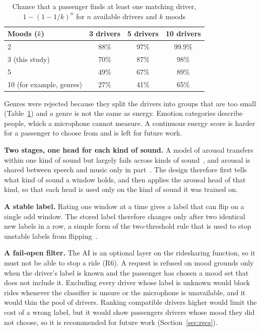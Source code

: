 \begin{table}[htbp]
    \centering
    \caption{Chance that a passenger finds at least one matching driver, $1-(1-1/k)^n$ for $n$ available drivers and $k$ moods}\label{tab:ai-chance}
    \small
    \renewcommand{\arraystretch}{1.2}
    \begin{tabular}{|l|c|c|c|}
        \hline
        \textbf{Moods ($k$)} & \textbf{3 drivers} & \textbf{5 drivers} & \textbf{10 drivers} \\
        \hline
        2 & 88\% & 97\% & 99.9\% \\
        \hline
        3 (this study) & 70\% & 87\% & 98\% \\
        \hline
        5 & 49\% & 67\% & 89\% \\
        \hline
        10 (for example, genres) & 27\% & 41\% & 65\% \\
        \hline
    \end{tabular}
\end{table}

Genres were rejected because they split the drivers into groups that are too small (Table~\ref{tab:ai-chance}) and a genre is not the same as energy. Emotion categories describe people, which a microphone cannot measure. A continuous energy score is harder for a passenger to choose from and is left for future work.

\textbf{Two stages, one head for each kind of sound.} A model of arousal transfers within one kind of sound but largely fails across kinds of sound~\cite{zhang2026generalisation}, and arousal is shared between speech and music only in part~\cite{coutinho2014transfer}. The design therefore first tells what kind of sound a window holds, and then applies the arousal head of that kind, so that each head is used only on the kind of sound it was trained on.

\textbf{A stable label.} Rating one window at a time gives a label that can flip on a single odd window. The stored label therefore changes only after two identical new labels in a row, a simple form of the two-threshold rule that is used to stop unstable labels from flipping~\cite{cances2019postprocessing}.

\textbf{A fail-open filter.} The AI is an optional layer on the ridesharing function, so it must not be able to stop a ride (R6). A request is refused on mood grounds only when the driver's label is known and the passenger has chosen a mood set that does not include it. Excluding every driver whose label is unknown would block rides whenever the classifier is unsure or the microphone is unavailable, and it would thin the pool of drivers. Ranking compatible drivers higher would limit the cost of a wrong label, but it would show passengers drivers whose mood they did not choose, so it is recommended for future work (Section~\ref{sec:recs}).

